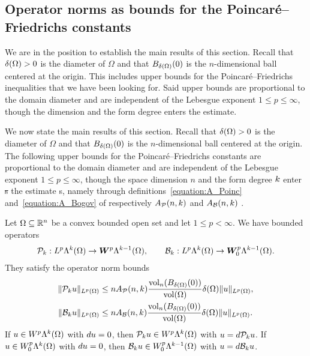 \documentclass[10pt,a4paper]{article}
\newcommand\cye[1]{%
\protect\leavevmode
\begingroup
    \color{blue}%
    #1%
\endgroup
}
\newcommand{\mwl}[1]{{\color{red}#1}}
\begin{document}
\subsection{Operator norms as bounds for the Poincar\'e--Friedrichs constants}

\mwl{We are in the position to establish the main results of this section.
Recall that ${\delta}(\Omega) > 0$ is the diameter of $\Omega$ and that $B_{{\delta}(\Omega)}(0)$ is the $n$-dimensional ball centered at the origin.
This includes upper bounds for the Poincar\'e--Friedrichs inequalities that we have been looking for. 
Said upper bounds are proportional to the domain diameter and are independent of the Lebesgue exponent $1 \leq p \leq \infty$,
though the dimension and the form degree enters the estimate.}

We now state the main results of this section. \cye{Recall that ${\delta}(\Omega) > 0$ is the diameter of $\Omega$ and that $B_{{\delta}(\Omega)}(0)$ is the $n$-dimensional ball centered at the origin.} The \cye{following} upper bounds for the Poincar\'e--Friedrichs \cye{constants} \cye{are} proportional to the domain diameter and are independent of the Lebesgue exponent $1 \leq p \leq \infty$,
though the \cye{space} dimension \cye{$n$} and the form degree \cye{$k$} enter\cye{\sout{s}} the estimate\cye{s, namely through definitions~\eqref{equation:A_Poinc} and~\eqref{equation:A_Bogov} of respectively $A_{{\mathcal P}}(n,k)$ and $A_{{\mathcal B}}(n,k)$}. 


\begin{theorem}\label{theorem:PF_EC}
    Let $\Omega \subseteq {\mathbb R}^{n}$ be a convex bounded open set and let $1 \leq p < \infty$. 
    We have bounded operators 
    \begin{align*}
        {\mathcal P}_{k} : L^{p}\Lambda^{k}(\Omega) \rightarrow \bm{W}^{p}\Lambda^{k-1}(\Omega)
        ,
        \qquad 
        {\mathcal B}_{k} : L^{p}\Lambda^{k}(\Omega) \rightarrow \bm{W}^{p}_{0}\Lambda^{k-1}(\Omega)
        .
    \end{align*}
    They satisfy the operator norm bounds 
    \begin{align*}
        \| {\mathcal P}_{k} u \|_{L^{p}(\Omega)}
        &\leq 
        n A_{{\mathcal P}}(n,k) \frac{ \operatorname{vol}_{n}(B_{{\delta}(\Omega)}(0)) }{\operatorname{vol}(\Omega)} 
        {\delta}(\Omega)
        \| u \|_{L^{p}(\Omega)}
        ,
        \\
        \| {\mathcal B}_{k} u \|_{L^{p}(\Omega)}
        &\leq 
        n A_{{\mathcal B}}(n,k) \frac{ \operatorname{vol}_{n}(B_{{\delta}(\Omega)}(0)) }{\operatorname{vol}(\Omega)} 
        {\delta}(\Omega)
        \| u \|_{L^{p}(\Omega)}
        .
    \end{align*}
    If $u \in W^{p}    \Lambda^{k}(\Omega)$ with $d u = 0$, then ${\mathcal P}_{k} u \in W^{p}    \Lambda^{k  }(\Omega)$ with $u = d {\mathcal P}_{k} u$.
    If $u \in W^{p}_{0}\Lambda^{k}(\Omega)$ with $d u = 0$, then ${\mathcal B}_{k} u \in W^{p}_{0}\Lambda^{k-1}(\Omega)$ with $u = d {\mathcal B}_{k} u$.
\end{theorem}
\end{document}
